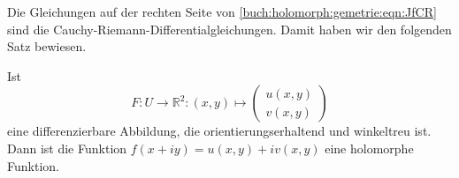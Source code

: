 Die Gleichungen auf der rechten Seite von
\eqref{buch:holomorph:gemetrie:eqn:JfCR}
sind die Cauchy-Riemann-Differential\-glei\-chun\-gen.
%
Damit haben wir den folgenden Satz bewiesen.

\begin{satz}
Ist 
\[
F
\colon
U \to \mathbb{R}^2
:
(x,y) \mapsto \begin{pmatrix} u(x,y)\\v(x,y)\end{pmatrix}
\]
eine differenzierbare Abbildung, die orientierungserhaltend und
winkeltreu ist.
Dann ist die Funktion $f(x+iy) = u(x,y) + iv(x,y)$ eine holomorphe
Funktion.
\end{satz}

